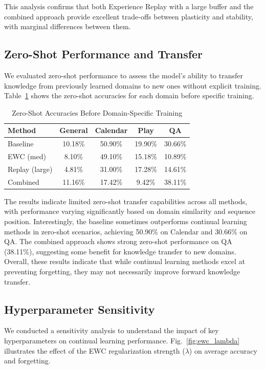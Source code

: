 \documentclass[conference]{IEEEtran}
\begin{document}
This analysis confirms that both Experience Replay with a large buffer and the combined approach provide excellent trade-offs between plasticity and stability, with marginal differences between them.

\subsection{Zero-Shot Performance and Transfer}
We evaluated zero-shot performance to assess the model's ability to transfer knowledge from previously learned domains to new ones without explicit training. Table~\ref{tab:zero_shot} shows the zero-shot accuracies for each domain before specific training.

\begin{table}[h]
\caption{Zero-Shot Accuracies Before Domain-Specific Training}
\label{tab:zero_shot}
\centering
\begin{tabular}{lcccc}
\hline
\textbf{Method} & \textbf{General} & \textbf{Calendar} & \textbf{Play} & \textbf{QA} \\
\hline
Baseline & 10.18\% & 50.90\% & 19.90\% & 30.66\% \\
EWC (med) & 8.10\% & 49.10\% & 15.18\% & 10.89\% \\
Replay (large) & 4.81\% & 31.00\% & 17.28\% & 14.61\% \\
Combined & 11.16\% & 17.42\% & 9.42\% & 38.11\% \\
\hline
\end{tabular}
\end{table}

The results indicate limited zero-shot transfer capabilities across all methods, with performance varying significantly based on domain similarity and sequence position. Interestingly, the baseline sometimes outperforms continual learning methods in zero-shot scenarios, achieving 50.90\% on Calendar and 30.66\% on QA. The combined approach shows strong zero-shot performance on QA (38.11\%), suggesting some benefit for knowledge transfer to new domains. Overall, these results indicate that while continual learning methods excel at preventing forgetting, they may not necessarily improve forward knowledge transfer.

\subsection{Hyperparameter Sensitivity}
We conducted a sensitivity analysis to understand the impact of key hyperparameters on continual learning performance. Fig.~\ref{fig:ewc_lambda} illustrates the effect of the EWC regularization strength ($\lambda$) on average accuracy and forgetting.
\end{document}

